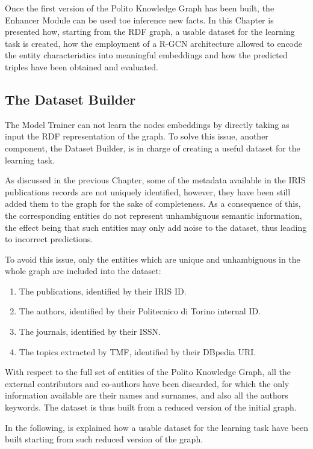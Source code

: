 \documentclass[%
    corpo=13.5pt,
    twoside,
    oldstyle,
    tipotesi=magistrale,
    greek,
    evenboxes
]{toptesi}
\begin{document}
Once the first version of the Polito Knowledge Graph has been built, the
Enhancer Module can be used toe inference new facts. In this Chapter is
presented how, starting from the RDF graph, a usable dataset
for the learning task is created, how the employment of a R-GCN architecture
allowed to encode the entity characteristics into meaningful embeddings and
how the predicted triples have been obtained and evaluated.


\subsection{The Dataset Builder}

The Model Trainer can not learn the nodes embeddings by directly taking as input
the RDF representation of the graph.
To solve this issue, another component, the Dataset Builder, is in charge of
creating a useful dataset for the learning task.

As discussed in the previous Chapter, some of the metadata available
in the IRIS publications records are not uniquely identified, however, they
have been still added them to the graph for the sake of completeness.
As a consequence of this, the corresponding entities do not represent
unhambiguous semantic information, the effect being that such entities may
only add noise to the dataset, thus leading to incorrect predictions.

To avoid this issue, only the entities
which are unique and unhambiguous in the whole graph are included into the
dataset:

\begin{enumerate}
    \item The publications, identified by their IRIS ID.
    \item The authors, identified by their Politecnico di
        Torino internal ID.
    \item The journals, identified by their ISSN.
    \item The topics extracted by TMF, identified by their DBpedia
        URI.
\end{enumerate}

With respect to the full set of entities of the Polito Knowledge Graph,
all the external contributors and co-authors have been discarded, for which
the only information available are their names and surnames, and also all the
authors keywords.
The dataset is thus built from a reduced version of the initial graph.

In the following, is explained how a usable dataset for the learning task have
been built starting from such reduced version of the graph.
\newline
\end{document}
